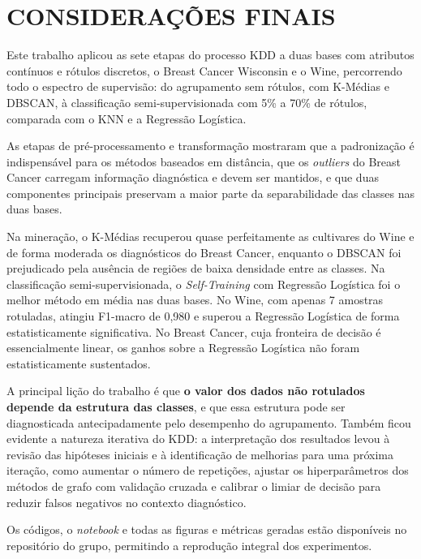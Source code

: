 \chapter[Considerações Finais]{CONSIDERAÇÕES FINAIS}

Este trabalho aplicou as sete etapas do processo KDD a duas bases com atributos contínuos e rótulos discretos, o Breast Cancer Wisconsin e o Wine, percorrendo todo o espectro de supervisão: do agrupamento sem rótulos, com K-Médias e DBSCAN, à classificação semi-supervisionada com 5\% a 70\% de rótulos, comparada com o KNN e a Regressão Logística.

As etapas de pré-processamento e transformação mostraram que a padronização é indispensável para os métodos baseados em distância, que os \textit{outliers} do Breast Cancer carregam informação diagnóstica e devem ser mantidos, e que duas componentes principais preservam a maior parte da separabilidade das classes nas duas bases.

Na mineração, o K-Médias recuperou quase perfeitamente as cultivares do Wine e de forma moderada os diagnósticos do Breast Cancer, enquanto o DBSCAN foi prejudicado pela ausência de regiões de baixa densidade entre as classes. Na classificação semi-supervisionada, o \textit{Self-Training} com Regressão Logística foi o melhor método em média nas duas bases. No Wine, com apenas 7 amostras rotuladas, atingiu F1-macro de 0,980 e superou a Regressão Logística de forma estatisticamente significativa. No Breast Cancer, cuja fronteira de decisão é essencialmente linear, os ganhos sobre a Regressão Logística não foram estatisticamente sustentados.

A principal lição do trabalho é que \textbf{o valor dos dados não rotulados depende da estrutura das classes}, e que essa estrutura pode ser diagnosticada antecipadamente pelo desempenho do agrupamento. Também ficou evidente a natureza iterativa do KDD: a interpretação dos resultados levou à revisão das hipóteses iniciais e à identificação de melhorias para uma próxima iteração, como aumentar o número de repetições, ajustar os hiperparâmetros dos métodos de grafo com validação cruzada e calibrar o limiar de decisão para reduzir falsos negativos no contexto diagnóstico.

Os códigos, o \textit{notebook} e todas as figuras e métricas geradas estão disponíveis no repositório do grupo, permitindo a reprodução integral dos experimentos.
